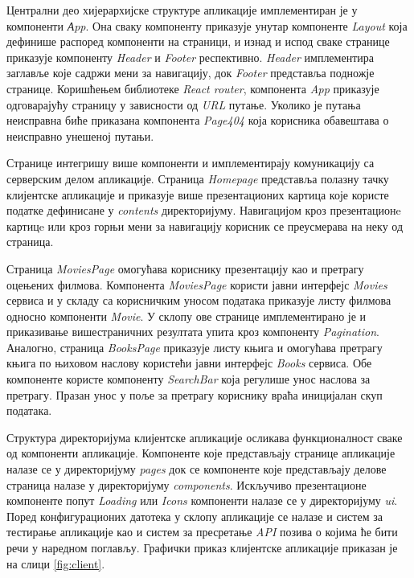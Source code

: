 \documentclass[12pt,oneside]{memoir}
\begin{document}
Централни део хијерархијске структуре апликације имплементиран је у компоненти \textit{Аpp}. Она сваку компоненту приказује унутар компоненте \textit{Layout} која дефинише распоред компоненти на страници, и изнад и испод сваке странице приказује компоненту \textit{Header} и \textit{Footer} респективно. \textit{Header} имплементира заглавље које садржи мени за навигацију, док \textit{Footer} представља подножје странице. Коришћењем библиотеке \textit{React router}, компонента \textit{App} приказује одговарајућу страницу у зависности од \textit{URL} путање. Уколико је путања неисправна биће приказана компонента \textit{Page404} која корисника обавештава о неисправно унешеној путањи.  

Странице интегришу више компоненти и имплементирају комуникацију са серверским делом апликације. Страница \textit{Homepage} представља полазну тачку клијентске апликације и приказује више презентационих картица које користе податке дефинисане у \textit{contents} директоријуму. Навигацијом кроз презентационe картицe или кроз горњи мени за навигацију корисник се преусмерава на неку од страница. 

Страница \textit{MoviesPage} омогућава кориснику презентацију као и претрагу оцењених филмова. Компонента  \textit{MoviesPage} користи јавни интерфејс \textit{Movies} сервиса и у складу са корисничким уносом података приказује листу филмова односно компоненти \textit{Movie}.  У склопу ове странице имплементирано је и приказивање вишестраничних резултата упита кроз компоненту \textit{Pagination}. Аналогно, страница \textit{BooksPage} приказује листу књига и омогућава претрагу књига по њиховом наслову користећи јавни интерфејс \textit{Books} сервиса. Обе компоненте користе компоненту \textit{SearchBar} која регулише унос наслова за претрагу. Празан унос у поље за претрагу кориснику враћа иницијалан скуп података.

Структура директоријума клијентске апликације осликава функционалност сваке од компоненти апликације. Компоненте које представљају странице апликације налазе се у директоријуму \textit{pages} док се компоненте које представљају делове страница налазе у директоријуму \textit{components}. Искључиво презентационе компоненте попут \textit{Loading} или \textit{Icons} компоненти налазе се у директоријуму \textit{ui}. Поред конфигурационих датотека у склопу апликације се налазе и систем за тестирање апликације као и систем за пресретање \textit{API} позива о којима ће бити речи у наредном поглављу. Графички приказ клијентске апликације приказан је на слици \ref{fig:client}. 
\end{document}
